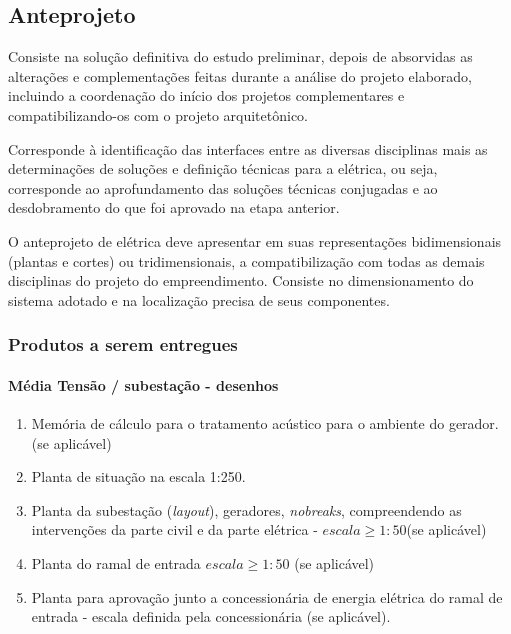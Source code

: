 \subsection{Anteprojeto} \label{subsection: etapa-projeto basico}

Consiste na solução definitiva do estudo preliminar, depois de absorvidas as alterações e complementações feitas durante a análise do projeto elaborado, incluindo a coordenação do início dos projetos complementares e compatibilizando-os com o projeto arquitetônico.

Corresponde à identificação das interfaces entre as diversas disciplinas mais as determinações de soluções e definição técnicas para a elétrica, ou seja, corresponde ao aprofundamento das soluções técnicas conjugadas e ao desdobramento do que foi aprovado na etapa anterior.

O anteprojeto de elétrica deve apresentar em suas representações bidimensionais (plantas e cortes) ou tridimensionais, a compatibilização com todas as demais disciplinas do projeto do empreendimento.
Consiste no dimensionamento do sistema adotado e na localização precisa de seus componentes.

\subsubsection{Produtos a serem entregues}


\paragraph{Média Tensão / subestação - desenhos}

\begin{enumerate}
	\item Memória de cálculo para o tratamento acústico para o ambiente do gerador. (se aplicável)
	
	\item Planta de situação na escala 1:250.
	
	\item Planta da subestação (\textit{layout}), geradores, \textit{nobreaks}, compreendendo as intervenções da  parte civil e da parte elétrica - $escala \geq 1:50$(se aplicável)
	
	\item Planta do ramal de entrada $escala \geq 1:50$ (se aplicável)
	
	\item Planta para aprovação junto a concessionária de energia elétrica do ramal de entrada - escala definida pela concessionária (se aplicável). 
\end{enumerate}

